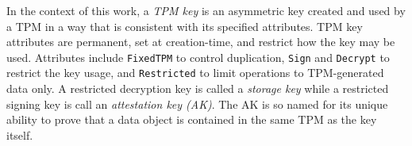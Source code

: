 \documentclass[runningheads]{llncs}
\begin{document}
In the context of this work, a \emph{TPM key} is an asymmetric key created
and used by a TPM in a way that is consistent with its specified attributes.
TPM key attributes are permanent, set at creation-time, and restrict how the key may
be used. Attributes include \verb|FixedTPM| to control duplication,
\verb|Sign| and \verb|Decrypt| to restrict the key usage, and
\verb|Restricted| to limit operations to TPM-generated data only.  A
restricted decryption key is called a \emph{storage key} while a
restricted signing key is call an \emph{attestation key (AK)}.  
The AK is so named for its unique ability to prove that a data
object is contained in the same TPM as the key itself.





\end{document}
